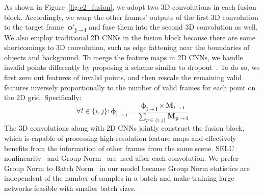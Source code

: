 As shown in Figure~\ref{fig:c2_fusion}, we adopt two 3D convolutions in each fusion block. Accordingly, we warp the other frames' outputs of the first 3D convolution to the target frame~$\boldsymbol{\phi'_{j \rightarrow i}}$ and fuse them into the second 3D convolution as well. We also employ traditional 2D CNNs in the fusion block because there are some shortcomings to 3D convolution, such as edge fattening near the boundaries of objects and background. To merge the feature maps in 2D CNNs, we handle invalid points differently by proposing a scheme similar to dropout~\citep{srivastava2014dropout}. To do so, we first zero out features of invalid points, and then rescale the remaining valid features inversely proportionally to the number of valid frames for each point on the 2D grid. Specifically:
\begin{equation}\label{eqn:rescaling}
\forall l \in \{i,j\}: \boldsymbol{\bar{\phi}_{l \rightarrow i}} = \frac{\boldsymbol{\phi_{l \rightarrow i}} \times \boldsymbol{M_{l \rightarrow i}}}{\displaystyle{\sum_{p \in \{i,j\}} \! \! \! \boldsymbol{M_{p \rightarrow i}}}}
\end{equation}
The 3D convolutions along with 2D CNNs jointly construct the fusion block, which is capable of processing high-resolution feature maps and effectively benefits from the information of other frames from the same scene. SELU nonlinearity~\citep{klambauer2017self} and Group Norm~\citep{wu2018group} are used after each convolution. We prefer Group Norm to Batch Norm~\citep{ioffe2015batch} in our model because Group Norm statistics are independent of the number of samples in a batch and make training large networks feasible with smaller batch sizes.

